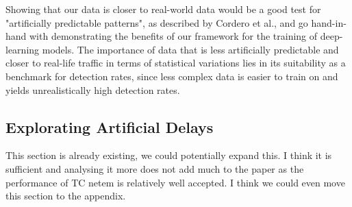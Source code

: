 \documentclass{article}
\begin{document}
Showing that our data is closer to real-world data would be a good test for "artificially predictable patterns", as described by Cordero et al., and go hand-in-hand with demonstrating the benefits of our framework for the training of deep-learning models. The importance of data that is less artificially predictable and closer to real-life traffic in terms of statistical variations lies in its suitability as a benchmark for detection rates, since less complex data is easier to train on and yields unrealistically high detection rates. 









 



\subsection{Explorating Artificial Delays}

This section is already existing, we could potentially expand this. I think it is sufficient and analysing it more does not add much to the paper as the performance of TC netem is relatively well accepted. I think we could even move this section to the appendix.
\end{document}
